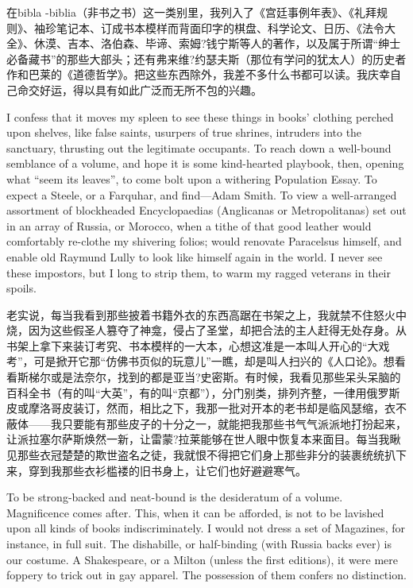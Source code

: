 {  在bibla -biblia（非书之书）这一类别里，我列入了《宫廷事例年表》、《礼拜规则》、袖珍笔记本、订成书本模样而背面印字的棋盘、科学论文、日历、《法令大全》、休漠、吉本、洛伯森、毕谛、索姆?钱宁斯等人的著作，以及属于所谓“绅士必备藏书”的那些大部头；还有弗来维?约瑟夫斯（那位有学问的犹太人）的历史者作和巴莱的《道德哲学》。把这些东西除外，我差不多什么书都可以读。我庆幸自己命交好运，得以具有如此广泛而无所不包的兴趣。
 
 I confess that it moves my spleen to see these things in books' clothing perched upon shelves, like false saints, usurpers of true shrines, intruders into the sanctuary, thrusting out the legitimate occupants. To reach down a well-bound semblance of a volume, and hope it is some kind-hearted playbook, then, opening what “seem its leaves”, to come bolt upon a withering Population Essay. To expect a Steele, or a Farquhar, and find—Adam Smith. To view a well-arranged assortment of blockheaded Encyclopaedias (Anglicanas or Metropolitanas) set out in an array of Russia, or Morocco, when a tithe of that good leather would comfortably re-clothe my shivering folios; would renovate Paracelsus himself, and enable old Raymund Lully to look like himself again in the world. I never see these impostors, but I long to strip them, to warm my ragged veterans in their spoils.
 
 老实说，每当我看到那些披着书籍外衣的东西高踞在书架之上，我就禁不住怒火中烧，因为这些假圣人篡夺了神龛，侵占了圣堂，却把合法的主人赶得无处存身。从书架上拿下来装订考究、书本模样的一大本，心想这准是一本叫人开心的“大戏考”，可是掀开它那“仿佛书页似的玩意儿”一瞧，却是叫人扫兴的《人口论》。想看看斯梯尔或是法奈尔，找到的都是亚当?史密斯。有时候，我看见那些呆头呆脑的百科全书（有的叫“大英”，有的叫“京都”），分门别类，排列齐整，一律用俄罗斯皮或摩洛哥皮装订，然而，相比之下，我那一批对开本的老书却是临风瑟缩，衣不蔽体——我只要能有那些皮子的十分之一，就能把我那些书气气派派地打扮起来，让派拉塞尔萨斯焕然一新，让雷蒙?拉莱能够在世人眼中恢复本来面目。每当我瞅见那些衣冠楚楚的欺世盗名之徒，我就恨不得把它们身上那些非分的装裹统统扒下来，穿到我那些衣衫槛褛的旧书身上，让它们也好避避寒气。
 

 To be strong-backed and neat-bound is the desideratum of a volume. Magnificence comes after. This, when it can be afforded, is not to be lavished upon all kinds of books indiscriminately. I would not dress a set of Magazines, for instance, in full suit. The dishabille, or half-binding (with Russia backs ever) is our costume. A Shakespeare, or a Milton (unless the first editions), it were mere foppery to trick out in gay apparel. The possession of them confers no distinction.
 
}
